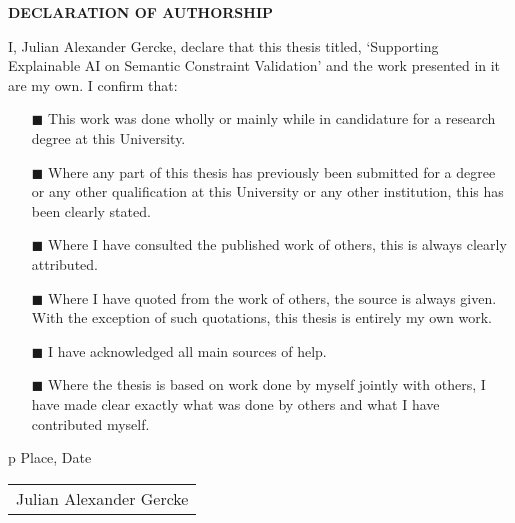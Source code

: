 \thispagestyle{empty} 
\leavevmode%
\vspace*{\fill}\noindent
\begin{center}
  \textbf{DECLARATION OF AUTHORSHIP}
\end{center}

I, Julian Alexander Gercke, declare that this thesis titled, `Supporting Explainable AI on Semantic Constraint Validation' and the work presented in it are my own. I confirm that:

\begin{itemize} 
\item[\tiny{$\blacksquare$}] This work was done wholly or mainly while in candidature for a research degree at this University.
 
\item[\tiny{$\blacksquare$}] Where any part of this thesis has previously been submitted for a degree or any other qualification at this University or any other institution, this has been clearly stated.
 
\item[\tiny{$\blacksquare$}] Where I have consulted the published work of others, this is always clearly attributed.
 
\item[\tiny{$\blacksquare$}] Where I have quoted from the work of others, the source is always given. With the exception of such quotations, this thesis is entirely my own work.
 
\item[\tiny{$\blacksquare$}] I have acknowledged all main sources of help.
 
\item[\tiny{$\blacksquare$}] Where the thesis is based on work done by myself jointly with others, I have made clear exactly what was done by others and what I have contributed myself.
\\
\end{itemize}
\vspace{1cm}
\newlength\us
\settowidth{\us}{-~~~~~~Julian Alexander Gercke~~~~~~-}
\begin{minipage}{0.5\linewidth}
    \centering
    \begin{tabular}{p{\us}}\hline
    \centering\footnotesize Place, Date
    \end{tabular}
\end{minipage}
\begin{minipage}{0.5\linewidth}
    \centering
    \begin{tabular}{p{\us}}\hline
    \centering\footnotesize Julian Alexander Gercke
    \end{tabular}
\end{minipage}


\hfill\strut
\vspace*{\fill}
